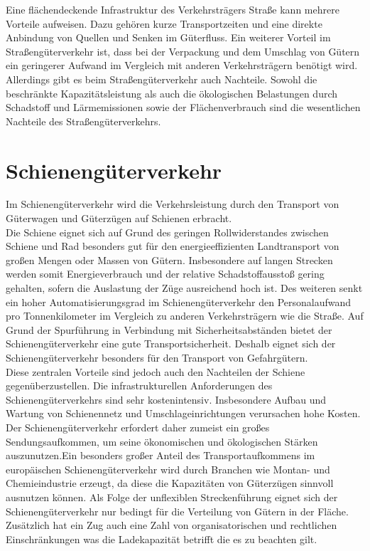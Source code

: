 \documentclass[a4paper,12pt]{scrreprt}
\begin{document}
	Eine flächendeckende Infrastruktur des Verkehrsträgers Straße kann mehrere Vorteile aufweisen. Dazu gehören kurze Transportzeiten und eine direkte Anbindung von Quellen und Senken im Güterfluss. Ein weiterer Vorteil im Straßengüterverkehr ist, dass bei der Verpackung und dem Umschlag von Gütern ein geringerer Aufwand im Vergleich mit anderen Verkehrsträgern benötigt wird.\\
	
	Allerdings gibt es beim Straßengüterverkehr auch Nachteile. Sowohl die beschränkte Kapazitätsleistung als auch die ökologischen Belastungen durch Schadstoff und Lärmemissionen sowie der Flächenverbrauch sind die wesentlichen Nachteile des Straßengüterverkehrs. 
	
	
	\section{Schienengüterverkehr}
	Im Schienengüterverkehr wird die Verkehrsleistung durch den Transport von Güterwagen und Güterzügen auf Schienen erbracht.\\
	
	Die Schiene eignet sich auf Grund des geringen Rollwiderstandes zwischen Schiene und Rad besonders gut für den energieeffizienten Landtransport von großen Mengen oder Massen von Gütern. Insbesondere auf langen Strecken werden somit Energieverbrauch und der relative Schadstoffausstoß gering gehalten, sofern die Auslastung der Züge ausreichend hoch ist. Des weiteren senkt ein hoher Automatisierungsgrad im Schienengüterverkehr den Personalaufwand pro Tonnenkilometer im Vergleich zu anderen Verkehrsträgern wie die Straße. Auf Grund der Spurführung in Verbindung mit Sicherheitsabständen bietet der Schienengüterverkehr eine gute Transportsicherheit. Deshalb eignet sich der Schienengüterverkehr besonders für den Transport von Gefahrgütern.\\
	Diese zentralen Vorteile sind jedoch auch den Nachteilen der Schiene gegenüberzustellen. Die infrastrukturellen Anforderungen des Schienengüterverkehrs sind sehr kostenintensiv. Insbesondere Aufbau und Wartung von Schienennetz und Umschlageinrichtungen verursachen hohe Kosten. Der Schienengüterverkehr erfordert daher zumeist ein großes Sendungsaufkommen, um seine ökonomischen und ökologischen Stärken auszunutzen.Ein besonders großer Anteil des Transportaufkommens im europäischen Schienengüterverkehr wird durch Branchen wie Montan- und Chemieindustrie erzeugt, da diese die Kapazitäten von Güterzügen sinnvoll ausnutzen können. Als Folge der unflexiblen Streckenführung eignet sich der Schienengüterverkehr nur bedingt für die Verteilung von Gütern in der Fläche. Zusätzlich hat ein Zug auch eine Zahl von organisatorischen und rechtlichen Einschränkungen was die Ladekapazität betrifft die es zu beachten gilt. 
	
\end{document}
